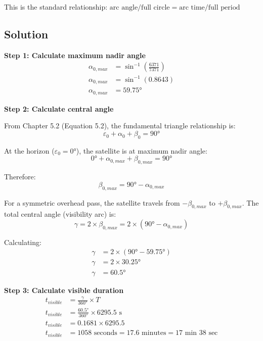 \documentclass[11pt,letterpaper]{article}
\begin{document}
This is the standard relationship: $\text{arc angle} / \text{full circle} = \text{arc time} / \text{full period}$

\subsection{Solution}
\textbf{Step 1: Calculate maximum nadir angle}
\begin{align}
\alpha_{0,max} &= \sin^{-1}\left(\frac{6371}{7371}\right) \\
\alpha_{0,max} &= \sin^{-1}(0.8643) \\
\alpha_{0,max} &= 59.75°
\end{align}

\textbf{Step 2: Calculate central angle}

From Chapter 5.2 (Equation 5.2), the fundamental triangle relationship is:
\begin{equation}
\varepsilon_0 + \alpha_0 + \beta_0 = 90°
\end{equation}

At the horizon ($\varepsilon_0 = 0°$), the satellite is at maximum nadir angle:
\begin{equation}
0° + \alpha_{0,max} + \beta_{0,max} = 90°
\end{equation}

Therefore:
\begin{equation}
\beta_{0,max} = 90° - \alpha_{0,max}
\end{equation}

For a symmetric overhead pass, the satellite travels from $-\beta_{0,max}$ to $+\beta_{0,max}$. The total central angle (visibility arc) is:
\begin{equation}
\gamma = 2 \times \beta_{0,max} = 2 \times (90° - \alpha_{0,max})
\end{equation}

Calculating:
\begin{align}
\gamma &= 2 \times (90° - 59.75°) \\
\gamma &= 2 \times 30.25° \\
\gamma &= 60.5°
\end{align}

\textbf{Step 3: Calculate visible duration}
\begin{align}
t_{visible} &= \frac{\gamma}{360°} \times T \\
t_{visible} &= \frac{60.5°}{360°} \times 6295.5 \text{ s} \\
t_{visible} &= 0.1681 \times 6295.5 \\
t_{visible} &= 1058 \text{ seconds} = 17.6 \text{ minutes} = 17 \text{ min } 38 \text{ sec}
\end{align}
\end{document}

